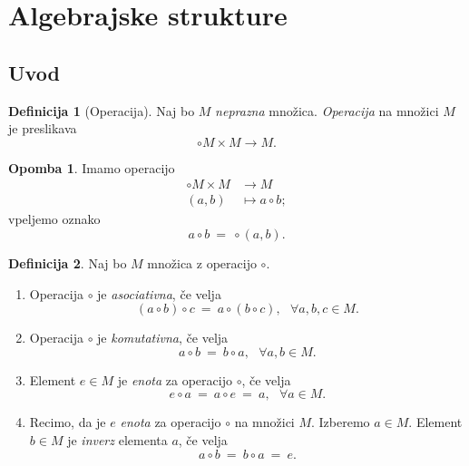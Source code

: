 \documentclass[11pt]{article}
\newcommand{\0}{\mathbf{0}}
\newcommand{\M}{M}
\theoremstyle{definition}
\newtheorem{definicija}{Definicija}[section]
\theoremstyle{definition}
\theoremstyle{definition}
\theoremstyle{definition}
\newtheorem*{opomba}{Opomba}
\begin{document}
\pagebreak


\section{Algebrajske strukture}
\vspace{0.5cm}


\subsection{Uvod}
\vspace{0.5cm}

\begin{definicija}[Operacija]

Naj bo $\M$ \textit{neprazna} množica. \textit{Operacija} na množici $\M$ je  preslikava
$$\circ \M\times \M \longrightarrow \M.$$

\end{definicija}
\vspace{0.5cm}

\begin{opomba}

Imamo operacijo
\begin{align*}
\circ\M\times\M &\rightarrow \M \\
(a,b) &\mapsto a \circ b;
\end{align*}
vpeljemo oznako 
$$a \circ b ~=~ \circ(a, b).$$

\end{opomba}
\vspace{0.5cm}

\begin{definicija}

Naj bo $\M$ množica z operacijo $\circ$.
\begin{enumerate}
	
\item Operacija $\circ$ je \textit{asociativna}, če velja
$$(a \circ b) \circ c ~=~ a \circ (b \circ c), ~~~\forall a,b,c \in \M.$$

\item Operacija $\circ$ je \textit{komutativna}, če velja
$$a \circ b ~=~ b \circ a, ~~~\forall a,b \in \M.$$	

\item Element $e \in \M$ je \textit{enota} za operacijo $\circ$, če velja
$$e \circ a ~=~ a \circ e ~=~ a, ~~~\forall a \in \M.$$

\item Recimo, da je $e$ \textit{enota} za operacijo $\circ$ na množici $\M$. Izberemo $a \in \M$. Element $b \in \M$ je \textit{inverz} elementa $a$, če velja
$$a \circ b ~=~ b \circ a~=~ e.$$ 
	
\end{enumerate}

\end{definicija}
\vspace{0.5cm}
\end{document}
